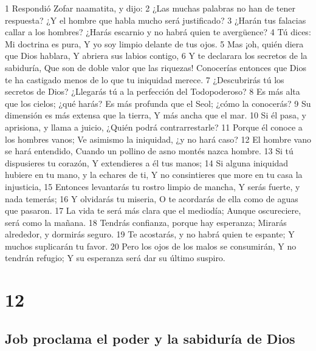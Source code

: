 1 Respondió Zofar naamatita, y dijo:
2 ¿Las muchas palabras no han de tener respuesta?
¿Y el hombre que habla mucho será justificado?
3 ¿Harán tus falacias callar a los hombres?
¿Harás escarnio y no habrá quien te avergüence?
4 Tú dices: Mi doctrina es pura,
Y yo soy limpio delante de tus ojos.
5 Mas ¡oh, quién diera que Dios hablara,
Y abriera sus labios contigo,
6 Y te declarara los secretos de la sabiduría,
Que son de doble valor que las riquezas!
Conocerías entonces que Dios te ha castigado menos de lo que tu iniquidad merece.
7 ¿Descubrirás tú los secretos de Dios?
¿Llegarás tú a la perfección del Todopoderoso?
8 Es más alta que los cielos; ¿qué harás?
Es más profunda que el Seol; ¿cómo la conocerás?
9 Su dimensión es más extensa que la tierra,
Y más ancha que el mar.
10 Si él pasa, y aprisiona, y llama a juicio,
¿Quién podrá contrarrestarle?
11 Porque él conoce a los hombres vanos;
Ve asimismo la iniquidad, ¿y no hará caso?
12 El hombre vano se hará entendido,
Cuando un pollino de asno montés nazca hombre.
13 Si tú dispusieres tu corazón,
Y extendieres a él tus manos;
14 Si alguna iniquidad hubiere en tu mano, y la echares de ti,
Y no consintieres que more en tu casa la injusticia,
15 Entonces levantarás tu rostro limpio de mancha,
Y serás fuerte, y nada temerás;
16 Y olvidarás tu miseria,
O te acordarás de ella como de aguas que pasaron.
17 La vida te será más clara que el mediodía;
Aunque oscureciere, será como la mañana.
18 Tendrás confianza, porque hay esperanza;
Mirarás alrededor, y dormirás seguro.
19 Te acostarás, y no habrá quien te espante;
Y muchos suplicarán tu favor.
20 Pero los ojos de los malos se consumirán,
Y no tendrán refugio; 
Y su esperanza será dar su último suspiro.

\chapter{12}

\section*{Job proclama el poder y la sabiduría de Dios}

